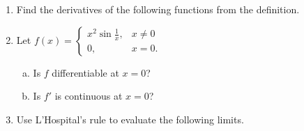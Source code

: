\documentclass[journal,12pt,onecolumn]{IEEEtran}
\begin{document}
\begin{enumerate}
 

\item Find the derivatives of the following functions from the definition.                   

\begin{enumerate}[(i)]
\end{enumerate}

\item Let 
 $
f(x)=\begin{cases}
x^2 \sin \frac{1}{x},& x\neq0 \\
0,&x=0.
\end{cases}
$


\setlength\itemsep{2em}
\begin{enumerate}[(a).]

\item Is $f$ differentiable at $x=0$?
\item Is $f'$ is continuous at $x=0$?
\end{enumerate}

\item Use L'Hospital's rule to evaluate the following limits.

\begin{enumerate}[(i)]
\end{enumerate}
\end{enumerate}
\end{document}
